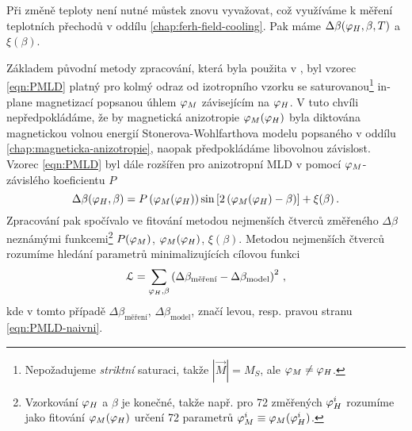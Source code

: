 Při změně teploty není nutné můstek znovu vyvažovat, což využíváme k měření teplotních přechodů v oddílu \ref{chap:ferh-field-cooling}.
Pak máme $\Delta\beta(\varphi_H, \beta, T)$ a $\xi(\beta)$.

Základem původní metody zpracování, která byla použita v \cite{wohlrathMagnetooptickaCharakterizaceSpintronickych2018,kubascikMagnetooptickeStudiumAntiferomagnetickych2019,kimakOptickaSpektroskopieAntiferomagnetu2019}, byl vzorec \eqref{eqn:PMLD} platný pro kolmý odraz od izotropního vzorku se saturovanou\footnote{Nepožadujeme \emph{striktní} saturaci, takže $|\vec{M}|=M_S$, ale $\varphi_M\neq\varphi_H$.} in-plane magnetizací popsanou úhlem $\varphi_M$ závisejícím na $\varphi_H$.
V tuto chvíli nepředpokládáme, že by magnetická anizotropie $\varphi_M(\varphi_H)$ byla diktována magnetickou volnou energií Stonerova-Wohlfarthova modelu popsaného v oddílu \ref{chap:magneticka-anizotropie}, naopak předpokládáme libovolnou závislost.
Vzorec \eqref{eqn:PMLD} byl dále rozšířen pro anizotropní MLD v \cite{wohlrathMagnetooptickaCharakterizaceSpintronickych2018} pomocí $\varphi_M$-závislého koeficientu $P$
\begin{equation}
\label{eqn:PMLD-naivni}
\Delta\beta(\varphi_H, \beta)=P\left(\varphi_M(\varphi_H)\right) \sin\left[2\left(\varphi_M(\varphi_H)-\beta\right)\right]+\xi(\beta) \,.
\end{equation}
Zpracování pak spočívalo ve fitování metodou nejmenších čtverců změřeného $\Delta\beta$ neznámými funkcemi\footnote{Vzorkování $\varphi_H$ a $\beta$ je konečné, takže např. pro 72 změřených $\varphi_H^i$ rozumíme jako fitování $\varphi_M(\varphi_H)$ určení 72 parametrů $\varphi_M^i\equiv\varphi_M(\varphi_H^i)$.} $P(\varphi_M)$, $\varphi_M(\varphi_H)$, $\xi(\beta)$.
Metodou nejmenších čtverců rozumíme hledání parametrů minimalizujících cílovou funkci
\begin{equation}
\label{eqn:L}
    \mathcal{L} = \sum_{\varphi_H, \beta} \left( \Delta\beta_\textrm{měření} - \Delta\beta_\textrm{model} \right)^2\,,
\end{equation}
kde v tomto případě $\Delta\beta_\textrm{měření}$, $\Delta\beta_\textrm{model}$, značí levou, resp. pravou stranu \eqref{eqn:PMLD-naivni}.

